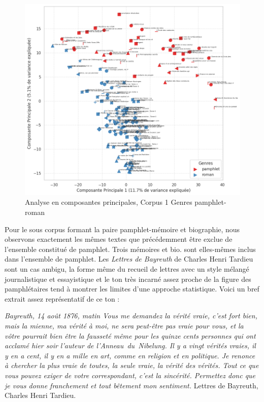 \begin{figure}[H]
\centering %
\includegraphics[width=1\textwidth]{img/ACP-corpus-mix-PamRoman.png}
\caption{Analyse en composantes principales, Corpus 1 Genres pamphlet-roman}
\label{'fig:ACP-corpus-mix-PamRoman'}
\end{figure}

Pour le sous corpus formant la paire pamphlet-mémoire et biographie, nous observons exactement les mêmes textes que précédemment être exclue de l'ensemble constitué de pamphlet. Trois mémoires et bio. sont elles-mêmes inclus dans l'ensemble de pamphlet. Les \textit{Lettres de Bayreuth} de Charles Henri Tardieu sont un cas ambigu, la forme même du recueil de lettres avec un style mélangé journalistique et essayistique et le ton très incarné assez proche de la figure des pamphlétaires tend à montrer les limites d'une approche statistique. Voici un bref extrait assez représentatif de ce ton :\\

\par\textit{ Bayreuth, 14 août 1876, matin 
 Vous me demandez la vérité vraie, c'est fort bien, mais la mienne, ma vérité à moi, ne sera peut-être pas vraie pour vous, et la vôtre pourrait bien être la fausseté même pour les quinze cents personnes qui ont acclamé hier soir l'auteur de l'Anneau du Nibelung. Il y a vingt vérités vraies, il y en a cent, il y en a mille en art, comme en religion et en politique. Je renonce à chercher la plus vraie de toutes, la seule vraie, la vérité des vérités. Tout ce que vous pouvez exiger de votre correspondant, c'est la sincérité. Permettez donc que je vous donne franchement et tout bêtement mon sentiment.} Lettres de Bayreuth, Charles Henri Tardieu.

